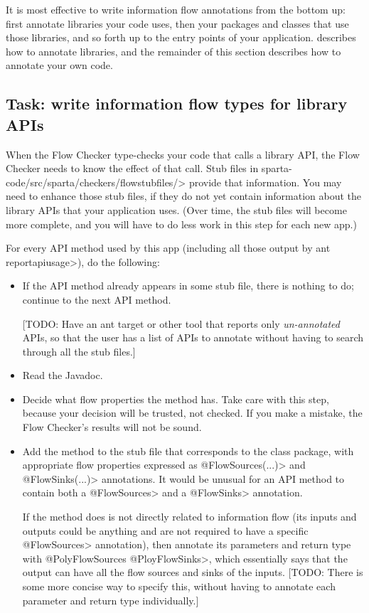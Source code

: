 It is most effective to write information flow annotations from the bottom
up:  first annotate libraries your code uses, then your packages and
classes that use those libraries, and so forth up to the entry points of
your application.
 describes how to annotate libraries, and
the remainder of this section describes how to annotate your own code.


\subsection{Task: write information flow types for library APIs\label{flow-task-annotate-apis}}

When the Flow Checker type-checks your code that calls a library API, the
Flow Checker needs to know the effect of that call.  
Stub files in \<sparta-code/src/sparta/checkers/flowstubfiles/> provide
that information.  You may need to enhance those stub files, if they do not
yet contain information about the library APIs that your application uses.
(Over time, the stub files will become more complete, and you will have to
do less work in this step for each new app.)

For every API method used by this app (including all those output by \<ant
reportapiusage>), do the following:
\begin{itemize}
\item
If the API method already appears in some stub file, there is nothing to
do; continue to the next API method.

[TODO:  Have an ant target or other tool that reports only
\emph{un-annotated} APIs, so that the user has a list of APIs to annotate
without having to search through all the stub files.]
\item
Read the Javadoc.
\item
Decide what flow properties the method has.  Take care with this step,
because your decision will be trusted, not checked.  If you make a mistake,
the Flow Checker's results will not be sound.
\item
Add the method to the stub file that corresponds to the class package, with
appropriate flow properties expressed as \<@FlowSources(...)> and
\<@FlowSinks(...)> annotations.
It would be unusual for an API method to contain both a \<@FlowSources>
and a \<@FlowSinks> annotation.

If the method does is not directly related to information flow (its inputs
and outputs could be anything and are not required to have a specific
\<@FlowSources> annotation), then annotate its parameters and return type
with \<@PolyFlowSources @PloyFlowSinks>, which essentially says that the
output can have all the flow sources and sinks of the inputs.
[TODO: There is some more concise way to specify this, without having to
annotate each parameter and return type individually.]
\end{itemize}

